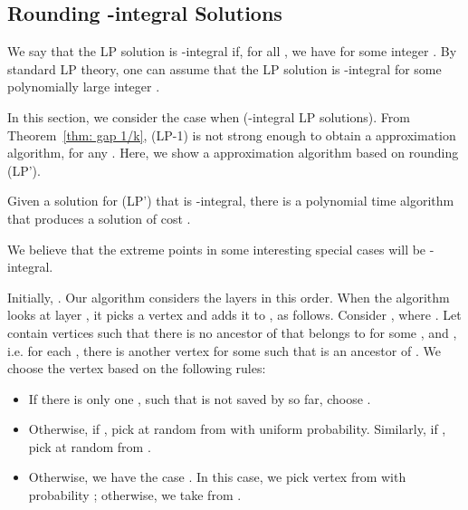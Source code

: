 \subsection{Rounding \texorpdfstring{}{1/2}-integral Solutions}
\label{sec:half-int}
We say that the LP solution  is -integral if, for all , we have  for some integer .  
By standard LP theory, one can assume that the LP solution is -integral for some polynomially large integer . 



In this section, we consider the case when  (-integral LP solutions).  
From Theorem~\ref{thm: gap 1/k}, (LP-1) is not strong enough to obtain a  approximation algorithm, for any . 
Here, we show a  approximation algorithm based on rounding (LP').  

\begin{theorem} 
Given a solution  for (LP') that is -integral, there is a polynomial time algorithm that produces a solution of cost .  
\label{thm:12intalgo}
\end{theorem} 

We believe that the extreme points in some interesting special cases will be -integral. 

\vspace{0.1in} 

Initially, . 
Our algorithm considers the layers  in this order.
When the algorithm looks at layer , it picks a vertex  and adds it to , as follows. 
Consider , where .
Let  contain vertices  such that there is no ancestor of  that belongs to  for some , and , i.e. for each , there is another vertex  for some  such that  is an ancestor of .
We choose the vertex  based on the following rules: 
\begin{itemize} 
\item If there is only one , such that  is not saved by  so far, choose . 

\item Otherwise, if , pick  at random from  with uniform probability.
Similarly, if , pick  at random from .  

\item Otherwise, we have the case . In this case, we pick vertex  from  with probability ; otherwise, we take from .  
\end{itemize}   


